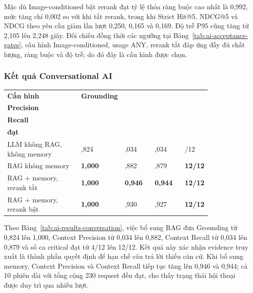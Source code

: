 Mặc dù Image-conditioned bật rerank đạt tỷ lệ thỏa ràng buộc cao nhất là 0,992, mức tăng chỉ 0,002 so với khi tắt rerank, trong khi Strict Hit@5, NDCG@5 và NDCG theo yêu cầu giảm lần lượt 0,250, 0,165 và 0,169. Độ trễ P95 cũng tăng từ 2,105 lên 2,248 giây. Đối chiếu đồng thời các ngưỡng tại Bảng~\ref{tab:ai-acceptance-gates}, cấu hình Image-conditioned, usage ANY, rerank tắt đáp ứng đầy đủ chất lượng, ràng buộc và độ trễ; do đó đây là cấu hình được chọn.

\subsubsection{Kết quả Conversational AI}

\begin{breakabletable}
\centering
\caption{Kết quả Conversational AI và các cấu hình ablation}
\label{tab:ai-results-conversation}
\small
\begin{tabularx}{\linewidth}{|>{\RaggedRight\arraybackslash}p{0.38\linewidth}|>{\centering\arraybackslash}p{0.15\linewidth}|>{\centering\arraybackslash}p{0.15\linewidth}|>{\centering\arraybackslash}p{0.15\linewidth}|>{\centering\arraybackslash}X|}
\hline
\textbf{Cấu hình} & \textbf{Grounding} & \makecell{\textbf{Context}\\\textbf{Precision}} & \makecell{\textbf{Context}\\\textbf{Recall}} & \makecell{\textbf{Critical}\\\textbf{đạt}} \\ \hline
LLM không RAG, không memory & 0,824 & 0,034 & 0,034 & 4/12 \\ \hline
RAG không memory & \textbf{1,000} & 0,882 & 0,879 & \textbf{12/12} \\ \hline
RAG + memory, rerank tắt & \textbf{1,000} & \textbf{0,946} & \textbf{0,944} & \textbf{12/12} \\ \hline
RAG + memory, rerank bật & \textbf{1,000} & 0,930 & 0,927 & \textbf{12/12} \\ \hline
\end{tabularx}
\end{breakabletable}

Theo Bảng~\ref{tab:ai-results-conversation}, việc bổ sung RAG đưa Grounding từ 0,824 lên 1,000, Context Precision từ 0,034 lên 0,882, Context Recall từ 0,034 lên 0,879 và số ca critical đạt từ 4/12 lên 12/12. Kết quả này xác nhận evidence truy xuất là thành phần quyết định để hạn chế câu trả lời thiếu căn cứ. Khi bổ sung memory, Context Precision và Context Recall tiếp tục tăng lên 0,946 và 0,944; cả 10 phiên dài với tổng cộng 230 request đều đạt, cho thấy trạng thái hội thoại được duy trì qua nhiều lượt.

